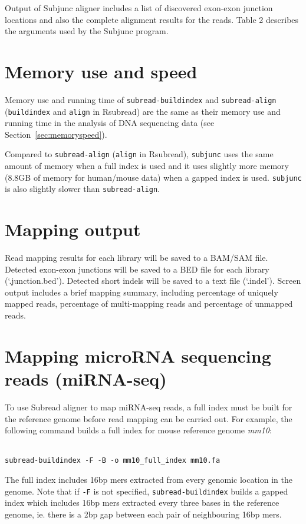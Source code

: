 \documentclass[12pt]{report}
\newcommand{\code}[1]{{\small\texttt{#1}}}
\newcommand{\Subread}{\textsf{Subread}}
\newcommand{\Subjunc}{\textsf{Subjunc}}
\newcommand{\Rsubread}{\textsf{Rsubread}}
\begin{document}
Output of {\Subjunc} aligner includes a list of discovered exon-exon junction locations and also the complete alignment results for the reads.
Table 2 describes the arguments used by the {\Subjunc} program.\\

\section{Memory use and speed}

Memory use and running time of \code{subread-buildindex} and \code{subread-align} (\code{buildindex} and \code{align} in \Rsubread) are the same as their memory use and running time in the analysis of DNA sequencing data (see Section~\ref{sec:memoryspeed}).

Compared to \code{subread-align} (\code{align} in \Rsubread), \code{subjunc} uses the same amount of memory when a full index is used and it uses slightly more memory (8.8GB of memory for human/mouse data) when a gapped index is used. 
\code{subjunc} is also slightly slower than \code{subread-align}.


\section{Mapping output}

Read mapping results for each library will be saved to a BAM/SAM file.
Detected exon-exon junctions will be saved to a BED file for each library (`.junction.bed').
Detected short indels will be saved to a text file (`.indel').
Screen output includes a brief mapping summary, including percentage of uniquely mapped reads, percentage of multi-mapping reads and percentage of unmapped reads.

\section{Mapping microRNA sequencing reads (miRNA-seq)}

To use {\Subread} aligner to map miRNA-seq reads, a full index must be built for the reference genome before read mapping can be carried out.
For example, the following command builds a full index for mouse reference genome \emph{mm10}:

\code{\\
subread-buildindex -F -B -o mm10\_full\_index mm10.fa \\
}

The full index includes 16bp mers extracted from every genomic location in the genome.
Note that if \code{-F} is not specified, \code{subread-buildindex} builds a gapped index which includes 16bp mers extracted every three bases in the reference genome, ie. there is a 2bp gap between each pair of neighbouring 16bp mers.
\end{document}
